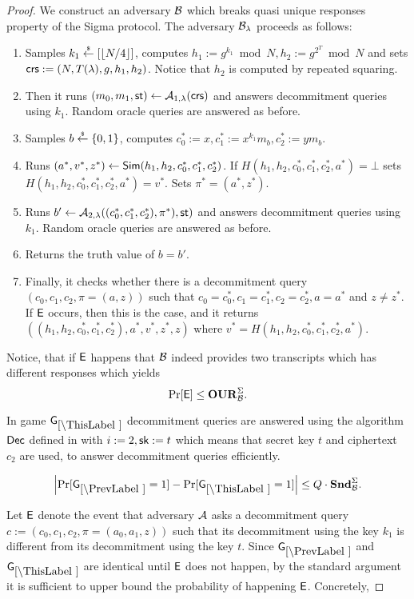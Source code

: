 \begin{proof}
We construct an adversary $\mathcal{B}$ which breaks quasi unique responses property of the Sigma protocol. 
The adversary $\mathcal{B}_{\lambda}$ proceeds as follows:
\vspace{-2mm}
\begin{enumerate}
\item Samples $k_1\stackrel{{\scriptscriptstyle\$}}{\leftarrow} [\left\lfloor N/4 \right\rfloor]$, computes $h_1 := g^{k_1} \bmod N, h_2:=g^{2^T} \bmod N$ and sets $\mathsf{crs}:=(N, T(\lambda), g, h_1, h_2)$. Notice that $h_2$ is computed by repeated squaring. 
\item Then it runs $(m_0, m_1, \mathsf{st}) \leftarrow \mathcal{A}_{1, \lambda}(\mathsf{crs})$ and answers decommitment queries using $k_1$. Random oracle queries are answered as before. 
\item Samples $b \stackrel{{\scriptscriptstyle\$}}{\leftarrow} \{0,1\}$, computes $c_0^*:=x, c_1^*:=x^{k_1} m_b, c_2^*:=y m_b$.
\item Runs $(a^*,v^*,z^*) \leftarrow \mathsf{Sim}(h_1, h_2, c_0^*, c_1^*, c_2^*)$. If $H(h_1, h_2, c_0^*, c_1^*, c_2^*,a^*) = \bot$ sets $H(h_1, h_2, c_0^*, c_1^*, c_2^*,a^*) = v^*$. Sets $\pi^* = (a^*,z^*)$.
\item Runs $b' \leftarrow \mathcal{A}_{2, \lambda}((c_0^*, c_1^*, c_2^*), \pi^*), \mathsf{st})$ and answers decommitment queries using $k_1$. Random oracle queries are answered as before. 
\item Returns the truth value of $b=b'$.
\item Finally, it checks whether there is a decommitment query $(c_0, c_1,c_2,\pi=(a,z))$ such that $c_0 = c_0^*, c_1 = c_1^*, c_2 = c_2^*, a = a^*$ and $z \neq z^*$. If $\mathsf{E}$ occurs, then this is the case, and it returns $((h_1, h_2, c_0^*, c_1^*, c_2^*),a^*,v^*,z^*,z)$ where $v^* = H(h_1, h_2, c_0^*, c_1^*, c_2^*,a^*)$.
\end{enumerate}

Notice, that if $\mathsf{E}$ happens that $\mathcal{B}$ indeed provides two transcripts which has different responses which yields
\[\Pr[\mathsf{E}] \leq \mathbf{OUR}^\Sigma_{\mathcal{B}}.\]

In game $\games_\thisgame$ decommitment queries are answered using the algorithm $\mathsf{Dec}$ defined in  with $i:=2, \mathsf{sk}:=t$ which means that secret key $t$ and ciphertext $c_2$ are used, to answer decommitment queries efficiently. 

\begin{lemma}
\[
\left|\Pr[\games_\prevgame = 1] - \Pr[\games_\thisgame = 1]\right| \leq Q\cdot\snd^\Sigma_\advB.
\]
\end{lemma}

Let $\mathsf{E}$ denote the event that adversary $\mathcal{A}$ asks a decommitment query $c:=(c_0,c_1,c_2, \pi=(a_0,a_1,z))$ such that its decommitment using the key $k_1$ is different from its decommitment using the key $t$. Since $\games_\prevgame$ and $\games_\thisgame$ are identical until $\mathsf{E}$ does not happen, by the standard argument it is sufficient to upper bound the probability of happening $\mathsf{E}$. Concretely,  


\end{proof}
